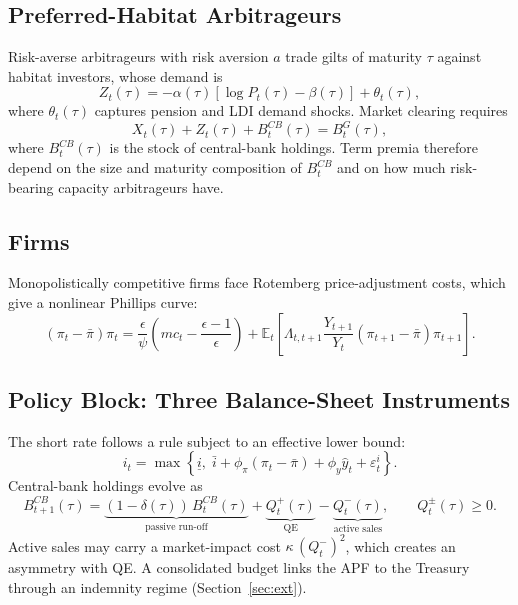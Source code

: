 \documentclass[11pt,a4paper]{article}
\begin{document}
\subsection{Preferred-Habitat Arbitrageurs}
Risk-averse arbitrageurs with risk aversion $a$ trade gilts of maturity $\tau$ against habitat investors, whose demand is
\begin{equation}
  Z_t(\tau) = -\alpha(\tau)\left[\log P_t(\tau) - \beta(\tau)\right] + \theta_t(\tau),
\end{equation}
where $\theta_t(\tau)$ captures pension and LDI demand shocks. Market clearing requires
\begin{equation}
  X_t(\tau) + Z_t(\tau) + B^{CB}_t(\tau) = B^{G}_t(\tau),
\end{equation}
where $B^{CB}_t(\tau)$ is the stock of central-bank holdings. Term premia therefore depend on the size and maturity composition of $B^{CB}_t$ and on how much risk-bearing capacity arbitrageurs have.

\subsection{Firms}
Monopolistically competitive firms face Rotemberg price-adjustment costs, which give a nonlinear Phillips curve:
\begin{equation}
  \left(\pi_t - \bar\pi\right)\pi_t = \frac{\epsilon}{\psi}\left(mc_t - \frac{\epsilon-1}{\epsilon}\right) + \mathbb{E}_t\left[\Lambda_{t,t+1}\frac{Y_{t+1}}{Y_t}\left(\pi_{t+1}-\bar\pi\right)\pi_{t+1}\right].
\end{equation}

\subsection{Policy Block: Three Balance-Sheet Instruments}
The short rate follows a rule subject to an effective lower bound:
\begin{equation}
  i_t = \max\left\{\underline{i},\; \bar{i} + \phi_\pi(\pi_t-\bar\pi) + \phi_y \hat{y}_t + \varepsilon^i_t\right\}.
\end{equation}
Central-bank holdings evolve as
\begin{equation}
  B^{CB}_{t+1}(\tau) = \underbrace{(1-\delta(\tau))\,B^{CB}_t(\tau)}_{\text{passive run-off}} + \underbrace{Q^{+}_t(\tau)}_{\text{QE}} - \underbrace{Q^{-}_t(\tau)}_{\text{active sales}}, \qquad Q^{\pm}_t(\tau)\ge 0.
\end{equation}
Active sales may carry a market-impact cost $\kappa\,(Q^{-}_t)^2$, which creates an asymmetry with QE. A consolidated budget links the APF to the Treasury through an indemnity regime (Section~\ref{sec:ext}).
\end{document}
